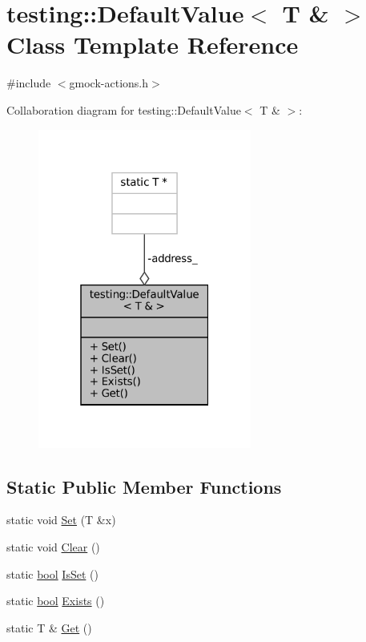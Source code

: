 \hypertarget{classtesting_1_1DefaultValue_3_01T_01_6_01_4}{}\section{testing\+:\+:Default\+Value$<$ T \& $>$ Class Template Reference}
\label{classtesting_1_1DefaultValue_3_01T_01_6_01_4}


{\ttfamily \#include $<$gmock-\/actions.\+h$>$}



Collaboration diagram for testing\+:\+:Default\+Value$<$ T \& $>$\+:
\nopagebreak
\begin{figure}[H]
\begin{center}
\leavevmode
\includegraphics[width=199pt]{classtesting_1_1DefaultValue_3_01T_01_6_01_4__coll__graph}
\end{center}
\end{figure}
\subsection*{Static Public Member Functions}
\begin{DoxyCompactItemize}
\item 
static void \hyperlink{classtesting_1_1DefaultValue_3_01T_01_6_01_4_a9863abf3d311ce5007d7e57dfce2f252}{Set} (T \&x)
\item 
static void \hyperlink{classtesting_1_1DefaultValue_3_01T_01_6_01_4_a3c8f9f81e591370f9b33798f58ca1a10}{Clear} ()
\item 
static \hyperlink{classbool}{bool} \hyperlink{classtesting_1_1DefaultValue_3_01T_01_6_01_4_a3e61547c2f0141cc8004385f3a9c817d}{Is\+Set} ()
\item 
static \hyperlink{classbool}{bool} \hyperlink{classtesting_1_1DefaultValue_3_01T_01_6_01_4_a38420499e17d2fb4146ae6c4265f0d55}{Exists} ()
\item 
static T \& \hyperlink{classtesting_1_1DefaultValue_3_01T_01_6_01_4_a1310448dd8c171aecfcbf7c8df5de7bd}{Get} ()
\end{DoxyCompactItemize}
